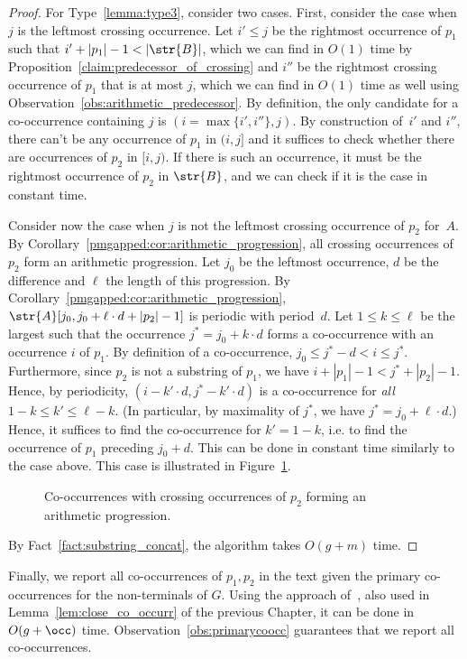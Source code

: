 \begin{proof}
For Type~\ref{lemma:type3}, consider two cases. First, consider the case when $j$ is the leftmost crossing occurrence. Let $i' \le j$ be the rightmost occurrence of $p_1$ such that $i'+|p_1|-1 < |\str{B}|$, which we can find in $O(1)$ time by Proposition~\ref{claim:predecessor_of_crossing} and $i''$ be the rightmost crossing occurrence of $p_1$ that is at most $j$, which we can find in $O(1)$ time as well using Observation~\ref{obs:arithmetic_predecessor}. By definition, the only candidate for a co-occurrence containing $j$ is $(i = \max\{i',i''\},j)$. By construction of~$i'$ and $i''$, there can't be any  occurrence of $p_1$ in $(i,j]$ and it suffices to check whether there are occurrences of $p_2$ in $[i,j)$. If there is such an occurrence, it must be the rightmost occurrence of $p_2$ in $\str{B}$, and we can check if it is the case in constant time. 

Consider now the case when $j$ is not the leftmost crossing occurrence of $p_2$ for~$A$.
By Corollary~\ref{pmgapped:cor:arithmetic_progression}, all crossing occurrences of $p_2$ form an arithmetic progression. Let $j_0$ be the leftmost occurrence, $d$ be the difference and $\ell$ the length of this progression. By Corollary~\ref{pmgapped:cor:arithmetic_progression}, $\str{A}[j_0, j_0+\ell \cdot d+|p_2|-1]$ is periodic with period~$d$. Let $1 \le k \le \ell$ be the largest such that the occurrence $j^\ast = j_0+k \cdot d$ forms a co-occurrence with an occurrence $i$ of $p_1$. By definition of a co-occurrence, $j_0 \le j^\ast-d < i \le j^\ast$. Furthermore, since $p_2$ is not a substring of $p_1$, we have $i+|p_1|-1 < j^\ast+|p_2|-1$. Hence, by periodicity, $(i-k'\cdot d, j^\ast-k' \cdot d)$ is a co-occurrence for \emph{all} $1-k \le k' \le \ell-k$. (In particular, by maximality of $j^\ast$, we have $j^\ast = j_0+\ell\cdot d$.) Hence, it suffices to find the co-occurrence for $k'=1-k$, i.e. to find the occurrence of $p_1$ preceding $j_0+d$. This can be done in constant time similarly to the case above. This case is illustrated in Figure~\ref{fig:p2_crossing_periodic}.


\begin{figure}
\centering
{}
\caption{Co-occurrences with crossing occurrences of $p_2$ forming an arithmetic progression.}
\label{fig:p2_crossing_periodic}
\end{figure}

By Fact~\ref{fact:substring_concat}, the algorithm takes $O(g+m)$ time. 

\end{proof}
    
Finally, we report all co-occurrences of $p_1,p_2$ in the text given the primary co-occurrences for the non-terminals of $G$. Using the approach of~\cite[Section 6.4]{talg/ChristiansenEKN21}, also used in Lemma~\ref{lem:close_co_occurr} of the previous Chapter, it can be done in $O(g+\occ)$ time. Observation~\ref{obs:primarycoocc} guarantees that we report all co-occurrences.
